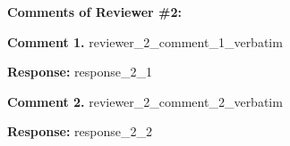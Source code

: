 \documentclass{article}
\begin{document}


\vspace{1.5em}

\noindent\textbf{\large Comments of Reviewer \#2:}

\vspace{1em}


\noindent\textbf{Comment 1.}
{{ reviewer_2_comment_1_verbatim }}

\vspace{0.5em}

{\color{blue}
\textbf{Response:}
{{ response_2_1 }}
}

\vspace{1.5em}


\noindent\textbf{Comment 2.}
{{ reviewer_2_comment_2_verbatim }}

\vspace{0.5em}

{\color{blue}
\textbf{Response:}
{{ response_2_2 }}
}

\vspace{1.5em}



%
%
%
%
%
%
\end{document}
